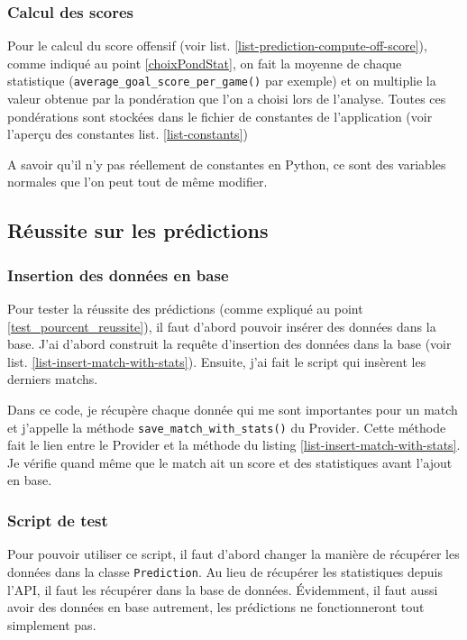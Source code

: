 \documentclass[a4paper,14pt]{extarticle}
\begin{document}
{

\subsubsection{Calcul des scores}

Pour le calcul du score offensif (voir list. \ref{list-prediction-compute-off-score}), comme indiqué au point \ref{choixPondStat}, on fait la moyenne de chaque statistique (\texttt{average\_goal\_score\_per\_game()} par exemple) et on multiplie la valeur obtenue par la pondération que l'on a choisi lors de l'analyse. Toutes ces pondérations sont stockées dans le fichier de constantes de l'application (voir l'aperçu des constantes list. \ref{list-constants})

A savoir qu'il n'y pas réellement de constantes en Python, ce sont des variables normales que l'on peut tout de même modifier.

\subsection{Réussite sur les prédictions}

\subsubsection{Insertion des données en base}

Pour tester la réussite des prédictions (comme expliqué au point \ref{test_pourcent_reussite}), il faut d'abord pouvoir insérer des données dans la base. J'ai d'abord construit la requête d'insertion des données dans la base (voir list. \ref{list-insert-match-with-stats}). Ensuite, j'ai fait le script qui insèrent les derniers matchs.


Dans ce code, je récupère chaque donnée qui me sont importantes pour un match et j'appelle la méthode \texttt{save\_match\_with\_stats()} du Provider. Cette méthode fait le lien entre le Provider et la méthode du listing \ref{list-insert-match-with-stats}. Je vérifie quand même que le match ait un score et des statistiques avant l'ajout en base.

\subsubsection{Script de test}
Pour pouvoir utiliser ce script, il faut d'abord changer la manière de récupérer les données dans la classe \texttt{Prediction}. Au lieu de récupérer les statistiques depuis l'API, il faut les récupérer dans la base de données. Évidemment, il faut aussi avoir des données en base autrement, les prédictions ne fonctionneront tout simplement pas.

}
\end{document}
